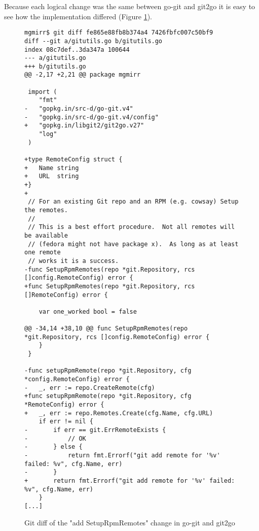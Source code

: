 \documentclass{article}
\begin{document}
Because each logical change was the same between go-git and git2go
it is easy to see how the implementation differed (Figure \ref{fig:srr}).

\begin{figure}
\begin{lstlisting}
mgmirr$ git diff fe865e88fb8b374a4 7426fbfc007c50bf9
diff --git a/gitutils.go b/gitutils.go
index 08c7def..3da347a 100644
--- a/gitutils.go
+++ b/gitutils.go
@@ -2,17 +2,21 @@ package mgmirr

 import (
 	"fmt"
-	"gopkg.in/src-d/go-git.v4"
-	"gopkg.in/src-d/go-git.v4/config"
+	"gopkg.in/libgit2/git2go.v27"
 	"log"
 )

+type RemoteConfig struct {
+	Name string
+	URL  string
+}
+
 // For an existing Git repo and an RPM (e.g. cowsay) Setup the remotes.
 //
 // This is a best effort procedure.  Not all remotes will be available
 // (fedora might not have package x).  As long as at least one remote
 // works it is a success.
-func SetupRpmRemotes(repo *git.Repository, rcs []config.RemoteConfig) error {
+func SetupRpmRemotes(repo *git.Repository, rcs []RemoteConfig) error {

 	var one_worked bool = false

@@ -34,14 +38,10 @@ func SetupRpmRemotes(repo *git.Repository, rcs []config.RemoteConfig) error {
 	}
 }

-func setupRpmRemote(repo *git.Repository, cfg *config.RemoteConfig) error {
-	_, err := repo.CreateRemote(cfg)
+func setupRpmRemote(repo *git.Repository, cfg *RemoteConfig) error {
+	_, err := repo.Remotes.Create(cfg.Name, cfg.URL)
 	if err != nil {
-		if err == git.ErrRemoteExists {
-			// OK
-		} else {
-			return fmt.Errorf("git add remote for '%v' failed: %v", cfg.Name, err)
-		}
+		return fmt.Errorf("git add remote for '%v' failed: %v", cfg.Name, err)
 	}
[...]
\end{lstlisting}
\caption{Git diff of the "add SetupRpmRemotes" change in go-git and git2go}
\label{fig:srr}
\end{figure}

\clearpage
\printbibliography[heading=bibintoc]
\end{document}
